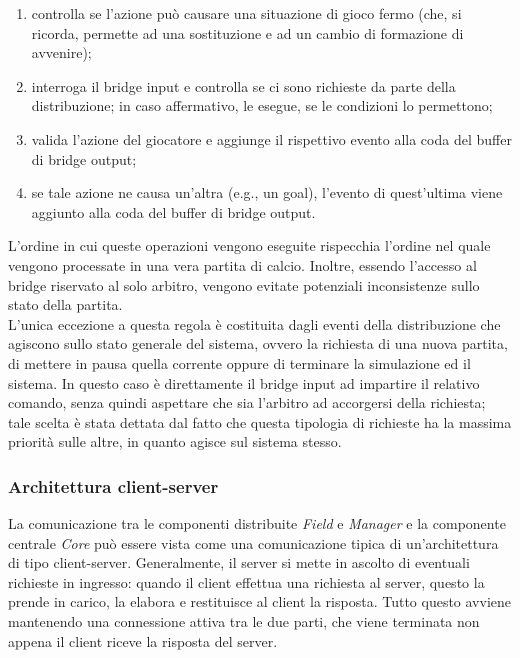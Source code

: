 \begin{enumerate}
	\item controlla se l'azione può causare una situazione di gioco fermo (che, si ricorda, permette ad una sostituzione e ad un cambio di formazione di avvenire);
	\item interroga il bridge input e controlla se ci sono richieste da parte della distribuzione; in caso affermativo, le esegue, se le condizioni lo permettono;
	\item valida l'azione del giocatore e aggiunge il rispettivo evento alla coda del buffer di bridge output;
	\item se tale azione ne causa un'altra (e.g., un goal), l'evento di quest'ultima viene aggiunto alla coda del buffer di bridge output.
\end{enumerate}

L'ordine in cui queste operazioni vengono eseguite rispecchia l'ordine nel quale vengono processate in una vera partita di calcio. Inoltre, essendo l'accesso al bridge riservato al solo arbitro, vengono evitate potenziali inconsistenze sullo stato della partita.\\

L'unica eccezione a questa regola è costituita dagli eventi della distribuzione che agiscono sullo stato generale del sistema, ovvero la richiesta di una nuova partita, di mettere in pausa quella corrente oppure di terminare la simulazione ed il sistema. In questo caso è direttamente il bridge input ad impartire il relativo comando, senza quindi aspettare che sia l'arbitro ad accorgersi della richiesta; tale scelta è stata dettata dal fatto che questa tipologia di richieste ha la massima priorità sulle altre, in quanto agisce sul sistema stesso.

\subsubsection{Architettura client-server}
\label{sec:analisi_client_server}

La comunicazione tra le componenti distribuite \textit{Field} e \textit{Manager} e la componente centrale \textit{Core} può essere vista come una comunicazione tipica di un'architettura di tipo client-server. Generalmente, il server si mette in ascolto di eventuali richieste in ingresso: quando il client effettua una richiesta al server, questo la prende in carico, la elabora e restituisce al client la risposta. Tutto questo avviene mantenendo una connessione attiva tra le due parti, che viene terminata non appena il client riceve la risposta del server.\\

